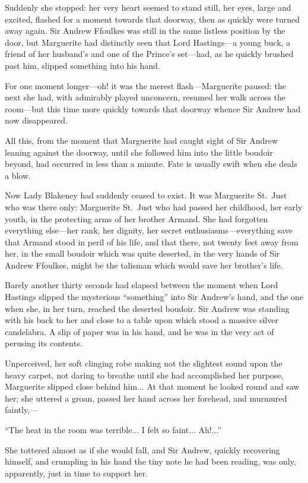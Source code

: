 \documentclass[paper=a5,BCOR=7mm,twoside,DIV=calc,12pt,usegeometry,chapterprefix,endperiod,headings=big]{scrbook}
\begin{document}
Suddenly she stopped: her very heart seemed to stand still, her eyes, large and excited, flashed for a moment towards that doorway, then as quickly were turned away again. Sir Andrew Ffoulkes was still in the same listless position by the door, but Marguerite had distinctly seen that Lord Hastings---a young buck, a friend of her husband's and one of the Prince's set---had, as he quickly brushed past him, slipped something into his hand.

For one moment longer---oh! it was the merest flash---Marguerite paused: the next she had, with admirably played unconcern, resumed her walk across the room---but this time more quickly towards that doorway whence Sir Andrew had now disappeared.

All this, from the moment that Marguerite had caught sight of Sir Andrew leaning against the doorway, until she followed him into the little boudoir beyond, had occurred in less than a minute. Fate is usually swift when she deals a blow.

Now Lady Blakeney had suddenly ceased to exist. It was Marguerite St.~Just who was there only: Marguerite St.~Just who had passed her childhood, her early youth, in the protecting arms of her brother Armand. She had forgotten everything else---her rank, her dignity, her secret enthusiasms---everything save that Armand stood in peril of his life, and that there, not twenty feet away from her, in the small boudoir which was quite deserted, in the very hands of Sir Andrew Ffoulkes, might be the talisman which would save her brother's life.

Barely another thirty seconds had elapsed between the moment when Lord Hastings slipped the mysterious \enquote{something} into Sir Andrew's hand, and the one when she, in her turn, reached the deserted boudoir. Sir Andrew was standing with his back to her and close to a table upon which stood a massive silver candelabra. A slip of paper was in his hand, and he was in the very act of perusing its contents.

Unperceived, her soft clinging robe making not the slightest sound upon the heavy carpet, not daring to breathe until she had accomplished her purpose, Marguerite slipped close behind him... At that moment he looked round and saw her; she uttered a groan, passed her hand across her forehead, and murmured faintly,---

\enquote{The heat in the room was terrible... I felt so faint... Ah!...}

She tottered almost as if she would fall, and Sir Andrew, quickly recovering himself, and crumpling in his hand the tiny note he had been reading, was only, apparently, just in time to support her.
\end{document}
